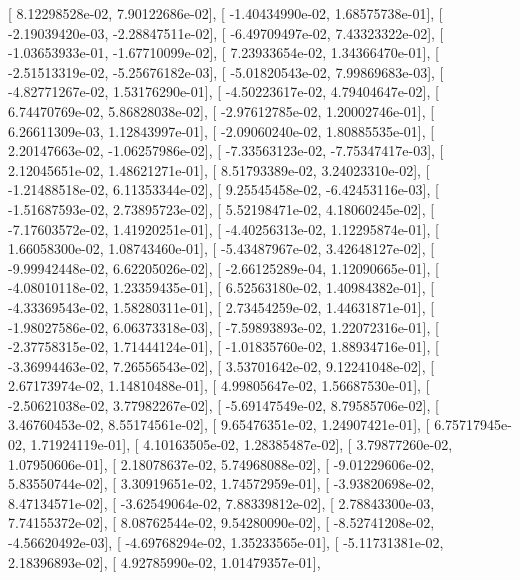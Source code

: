 \documentclass{article}
\begin{document}
       [  8.12298528e-02,   7.90122686e-02],
       [ -1.40434990e-02,   1.68575738e-01],
       [ -2.19039420e-03,  -2.28847511e-02],
       [ -6.49709497e-02,   7.43323322e-02],
       [ -1.03653933e-01,  -1.67710099e-02],
       [  7.23933654e-02,   1.34366470e-01],
       [ -2.51513319e-02,  -5.25676182e-03],
       [ -5.01820543e-02,   7.99869683e-03],
       [ -4.82771267e-02,   1.53176290e-01],
       [ -4.50223617e-02,   4.79404647e-02],
       [  6.74470769e-02,   5.86828038e-02],
       [ -2.97612785e-02,   1.20002746e-01],
       [  6.26611309e-03,   1.12843997e-01],
       [ -2.09060240e-02,   1.80885535e-01],
       [  2.20147663e-02,  -1.06257986e-02],
       [ -7.33563123e-02,  -7.75347417e-03],
       [  2.12045651e-02,   1.48621271e-01],
       [  8.51793389e-02,   3.24023310e-02],
       [ -1.21488518e-02,   6.11353344e-02],
       [  9.25545458e-02,  -6.42453116e-03],
       [ -1.51687593e-02,   2.73895723e-02],
       [  5.52198471e-02,   4.18060245e-02],
       [ -7.17603572e-02,   1.41920251e-01],
       [ -4.40256313e-02,   1.12295874e-01],
       [  1.66058300e-02,   1.08743460e-01],
       [ -5.43487967e-02,   3.42648127e-02],
       [ -9.99942448e-02,   6.62205026e-02],
       [ -2.66125289e-04,   1.12090665e-01],
       [ -4.08010118e-02,   1.23359435e-01],
       [  6.52563180e-02,   1.40984382e-01],
       [ -4.33369543e-02,   1.58280311e-01],
       [  2.73454259e-02,   1.44631871e-01],
       [ -1.98027586e-02,   6.06373318e-03],
       [ -7.59893893e-02,   1.22072316e-01],
       [ -2.37758315e-02,   1.71444124e-01],
       [ -1.01835760e-02,   1.88934716e-01],
       [ -3.36994463e-02,   7.26556543e-02],
       [  3.53701642e-02,   9.12241048e-02],
       [  2.67173974e-02,   1.14810488e-01],
       [  4.99805647e-02,   1.56687530e-01],
       [ -2.50621038e-02,   3.77982267e-02],
       [ -5.69147549e-02,   8.79585706e-02],
       [  3.46760453e-02,   8.55174561e-02],
       [  9.65476351e-02,   1.24907421e-01],
       [  6.75717945e-02,   1.71924119e-01],
       [  4.10163505e-02,   1.28385487e-02],
       [  3.79877260e-02,   1.07950606e-01],
       [  2.18078637e-02,   5.74968088e-02],
       [ -9.01229606e-02,   5.83550744e-02],
       [  3.30919651e-02,   1.74572959e-01],
       [ -3.93820698e-02,   8.47134571e-02],
       [ -3.62549064e-02,   7.88339812e-02],
       [  2.78843300e-03,   7.74155372e-02],
       [  8.08762544e-02,   9.54280090e-02],
       [ -8.52741208e-02,  -4.56620492e-03],
       [ -4.69768294e-02,   1.35233565e-01],
       [ -5.11731381e-02,   2.18396893e-02],
       [  4.92785990e-02,   1.01479357e-01],
\end{document}
